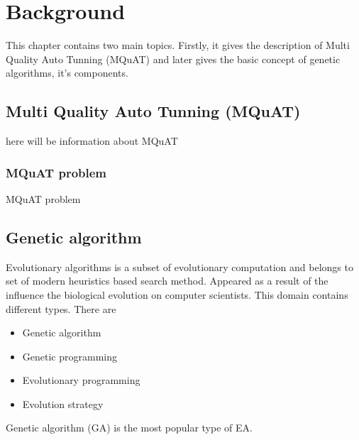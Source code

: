 \chapter{Background}
This chapter contains two main topics. Firstly, it gives the description of Multi Quality Auto Tunning (MQuAT) and later gives the basic concept of genetic algorithms, it's components.

\section{Multi Quality Auto Tunning (MQuAT)}
here will be information about MQuAT
\subsection{MQuAT problem}

MQuAT problem
     
\section{Genetic algorithm}
Evolutionary algorithms is a subset of evolutionary computation and belongs to set of modern heuristics based search method.
Appeared as a result of the influence the biological evolution on computer scientists. This domain contains different types.
There are
\begin{itemize}
	\item Genetic algorithm 
	\item Genetic programming
	\item Evolutionary programming
	\item Evolution strategy
\end{itemize}

Genetic algorithm (GA) is the most popular type of EA.

